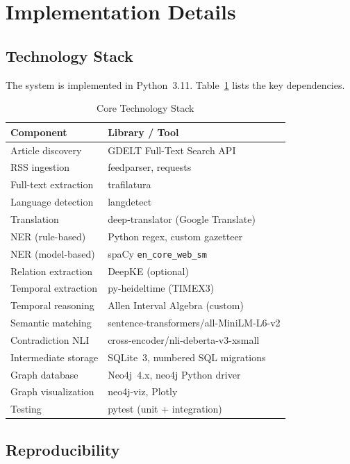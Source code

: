 \documentclass[conference]{IEEEtran}
\begin{document}
\section{Implementation Details}
\label{sec:implementation}

\subsection{Technology Stack}

The system is implemented in Python~3.11. Table~\ref{tab:stack} lists
the key dependencies.

\begin{table}[htbp]
\caption{Core Technology Stack}
\label{tab:stack}
\centering
\small
\begin{tabular}{ll}
\toprule
\textbf{Component} & \textbf{Library / Tool} \\
\midrule
Article discovery    & GDELT Full-Text Search API \\
RSS ingestion        & feedparser, requests \\
Full-text extraction & trafilatura \\
Language detection   & langdetect \\
Translation          & deep-translator (Google Translate) \\
NER (rule-based)     & Python regex, custom gazetteer \\
NER (model-based)    & spaCy \texttt{en\_core\_web\_sm} \\
Relation extraction  & DeepKE (optional) \\
Temporal extraction  & py-heideltime (TIMEX3) \\
Temporal reasoning   & Allen Interval Algebra (custom) \\
Semantic matching    & sentence-transformers/all-MiniLM-L6-v2 \\
Contradiction NLI    & cross-encoder/nli-deberta-v3-xsmall \\
Intermediate storage & SQLite~3, numbered SQL migrations \\
Graph database       & Neo4j~4.x, neo4j Python driver \\
Graph visualization  & neo4j-viz, Plotly \\
Testing              & pytest (unit + integration) \\
\bottomrule
\end{tabular}
\end{table}

\subsection{Reproducibility}
\end{document}

